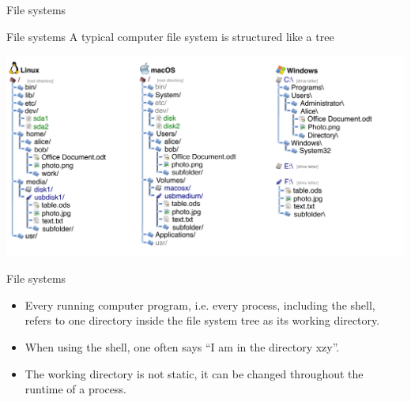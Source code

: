\documentclass[aspectratio=1610]{beamer}
\newcommand\curtitle{}
\begin{document}
\renewcommand\curtitle{File systems}

\begin{frame}[c]
    \Huge \curtitle
\end{frame}

\begin{frame}[c]{\curtitle}
    A typical computer \alert{file system} is structured like a \alert{tree}

    \medskip\centering\includegraphics[width=\linewidth]{filesystem.pdf}
\end{frame}


\begin{frame}[c]{\curtitle}
    \begin{itemize}[<+->]\setlength\itemsep{1em}
        \item Every running computer program, i.e. every process, including the \alert{shell}, refers to one directory
            inside the file system tree as its \alert{working directory}.
        \item When using the \alert{shell}, one often says \enquote{I am in the directory xzy}.
        \item The \alert{working directory} is not static, it can be changed throughout the runtime of a process.
    \end{itemize}
\end{frame}
\end{document}
